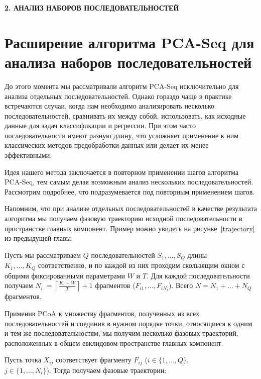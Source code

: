 \newpage
\begin{center}
  \textbf{\large 2. АНАЛИЗ НАБОРОВ ПОСЛЕДОВАТЕЛЬНОСТЕЙ}
\end{center}

\section{Расширение алгоритма PCA-Seq для анализа наборов последовательностей}

До этого момента мы рассматривали алгоритм PCA-Seq исключительно для анализа отдельных последовательностей. Однако гораздо чаще в практике встречаются случаи, когда нам необходимо анализировать несколько последовательностей, сравнивать их между собой, использовать, как исходные данные для задач классификации и регрессии. При этом часто последовательности имеют разную длину, что усложняет применение к ним классических методов предобработки данных или делает их менее эффективными.

Идея нашего метода заключается в повторном применении шагов алгоритма PCA-Seq, тем самым делая возможным анализ нескольких последовательностей. Рассмотрим подробнее, что подразумевается под повторным применением шагов.

Напомним, что при анализе отдельных последовательностей в качестве результата алгоритма мы получаем фазовую траекторию исходной последовательности в пространстве главных компонент. Пример можно увидеть на рисунке~\ref{trajectory} из предыдущей главы.

Пусть мы рассматриваем $Q$ последовательностей $S_1,\ldots,S_Q$ длины \\$K_1,\ldots,K_Q$ соответственно, и по каждой из них проходим скользящим окном с общими фиксированными параметрами $W$ и $T$. Для каждой последовательности получаем $N_i~= \left\lceil\frac{K_i-W}{T}\right\rceil + 1$ фрагментов ($F_{i1},\ldots, F_{iN_i}$). Всего $N = N_1 + \ldots + N_Q$ фрагментов.

Применив PCoA к множеству фрагментов, полученных из всех последовательностей и соединив в нужном порядке точки, относящиеся к одним и тем же последовательностям, мы получим несколько фазовых траекторий, расположенных в общем евклидовом пространстве главных компонент.

Пусть точка $X_{ij}$ соответствует фрагменту $F_{ij}$ ($i \in \{1,\ldots, Q\}$, \\$j \in \{1, \ldots, N_i\}$). Тогда получаем фазовые траектории:

